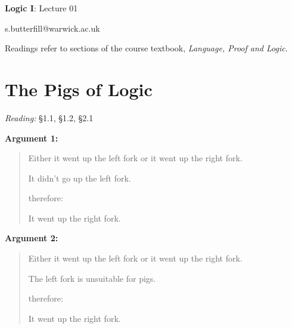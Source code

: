 \documentclass[12pt]{extarticle}
\date{}
\makeatletter
\def \ititle {Origins of Mind}
\def \isubtitle {Lecture 08}
\def \iemail{s.butterfill@warwick.ac.uk}
\makeatother
\begin{document}

\begin{multicols*}{3}

\setlength\footnotesep{1em}








\def \ititle {Logic I}
 
\def \isubtitle {Lecture 01}
 
\begin{center}
 
{\Large
 
\textbf{\ititle}: \isubtitle
 
}
 
 
 
\iemail %
 
\end{center}
 
Readings refer to sections of the course textbook, \emph{Language, Proof and Logic}.
 
 
 
\section{The Pigs of Logic}
 
\emph{Reading:} §1.1, §1.2, §2.1
 
\textbf{Argument 1:} \begin{quote} Either it went up the left fork or it went up the right fork.

It didn’t go up the left fork.

therefore:

It went up the right fork. \end{quote}

\textbf{Argument 2:} \begin{quote} Either it went up the left fork or it went up the right fork.

The left fork is unsuitable for pigs.

therefore:

It went up the right fork. \end{quote}

 
\begin{minipage}{\columnwidth}
 

\end{minipage}
\end{multicols*}
\end{document}
